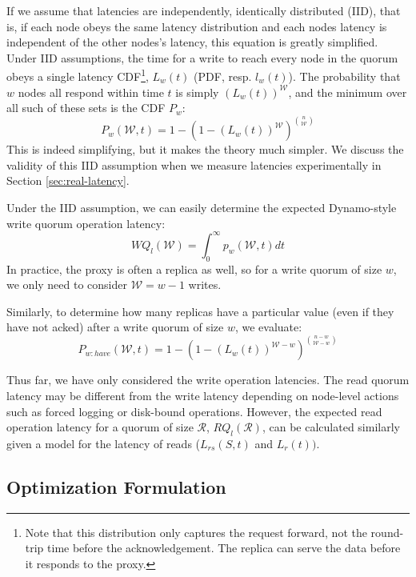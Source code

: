 \documentclass{vldb}
\begin{document}
If we assume that latencies are independently, identically distributed
(IID), that is, if each node obeys the same latency distribution and
each nodes latency is independent of the other nodes's latency, this
equation is greatly simplified.  Under IID assumptions, the time for a
write to reach every node in the quorum obeys a single latency
CDF\footnote{Note that this distribution only captures the request
  forward, not the round-trip time before the acknowledgement.  The
  replica can serve the data before it responds to the proxy.},
$L_w(t)$ (PDF, resp. $l_w(t)$).  The probability that $w$ nodes all
respond within time $t$ is simply $(L_w(t))^\mathcal{W}$, and the
minimum over all such of these sets is the CDF $P_w$:
\begin{equation}
P_w(\mathcal{W}, t) = 1-(1-(L_w(t))^\mathcal{W})^{n \choose \mathcal{W}}
\end{equation}
This is indeed simplifying, but it makes the theory much simpler.  We
discuss the validity of this IID assumption when we measure latencies
experimentally in Section \ref{sec:real-latency}.

Under the IID assumption, we can easily determine the expected
Dynamo-style write quorum operation latency:
\begin{equation}
WQ_l(\mathcal{W}) = \int_0^{\infty} p_w(\mathcal{W}, t) dt
\end{equation}
In practice, the proxy is often a replica as well, so for a write
quorum of size $w$, we only need to consider $\mathcal{W}=w-1$ writes.

Similarly, to determine how many replicas have a particular value (even if they have not acked) after a write quorum of size $w$, we evaluate:
\begin{equation}
P_{w:have}(\mathcal{W}, t) = 1-(1-(L_w(t))^{\mathcal{W}-w})^{n-w \choose \mathcal{W}-w}
\end{equation}


Thus far, we have only considered the write operation latencies.  The
read quorum latency may be different from the write latency depending
on node-level actions such as forced logging or disk-bound operations.
However, the expected read operation latency for a quorum of size
$\mathcal{R}$, $RQ_l(\mathcal{R})$, can be calculated similarly given a
model for the latency of reads ($L_{rs}(S,t)$ and $L_r(t))$.

\subsection{Optimization Formulation}
\end{document}
